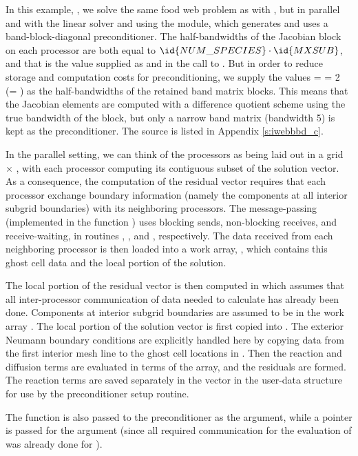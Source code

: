 In this example, , we solve the same food web problem as with
, but in parallel and with the {\idaspgmr} linear solver and
using the {\idabbdpre} module, which generates and uses a band-block-diagonal 
preconditioner.  
The half-bandwidths of the Jacobian block on each processor are both equal to
$\id{NUM\_SPECIES}\cdot\id{MXSUB}$, and that is the value supplied as  and 
in the call to .  But in order to reduce storage and computation
costs for preconditioning, we supply the values  =  = 2
(= ) as the half-bandwidths of the retained band matrix blocks.
This means that the Jacobian elements are computed with a difference quotient
scheme using the true bandwidth of the block, but only a narrow band matrix
(bandwidth 5) is kept as the preconditioner.  The source is listed in
Appendix \ref{s:iwebbbd_c}. 

In the parallel setting, we can think of the processors as being laid out
in a grid  $\times$ , with each processor computing its
contiguous subset of the solution vector. As a consequence, the computation 
of the residual vector requires that each processor exchange boundary information
(namely the components at all interior subgrid boundaries) with its neighboring processors.
The message-passing (implemented in the function ) uses blocking sends, 
non-blocking receives, and receive-waiting, in routines , ,
and , respectively.
The data received from each neighboring processor is then loaded into a work array,
, which contains this ghost cell data and the local portion of the solution.

The local portion of the residual vector is then computed in  which
assumes that all inter-processor communication of data
needed to calculate  has already been done.  Components at interior
subgrid boundaries are assumed to be in the work array .
The local portion of the solution vector  is first copied into .
The exterior Neumann boundary conditions are explicitly handled here
by copying data from the first interior mesh line to the ghost cell
locations in .  Then the reaction and diffusion terms are
evaluated in terms of the  array, and the residuals are formed.
The reaction terms are saved separately in the vector  in the user-data
structure  for use by the preconditioner setup routine. 

The function  is also passed to the {\idabbdpre} preconditioner
as the  argument, while a  pointer is passed for the 
argument (since all required communication for the evaluation of  was
already done for ).

